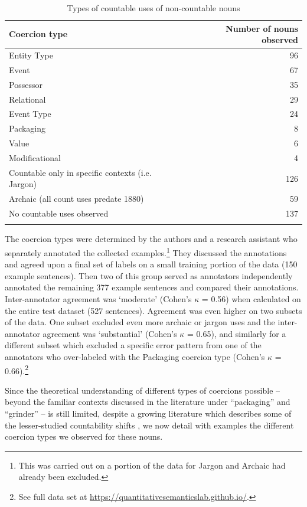 \documentclass[output=paper]{langscibook}
\begin{document}
\begin{table}
    \begin{tabular}{lr}
    \lsptoprule
        Coercion type    &  Number of nouns observed \\ 
  \midrule
 Entity Type  & 96 \\
 Event  & 67 \\ 
 Possessor  & 35 \\
 Relational & 29 \\
 Event Type  & 24 \\
 Packaging  & 8 \\
 Value & 6 \\
 Modificational & 4 \\
 Countable only in specific contexts (i.e. Jargon) & 126 \\
 Archaic (all count uses predate 1880) & 59 \\
  No countable uses observed & 137 \\
  \lspbottomrule
\end{tabular}
    \caption{Types of countable uses of non-countable nouns\label{gri-ric:tab:coercion}}
\end{table}


The coercion types were determined by the authors and a research assistant who separately annotated the collected examples.\footnote{This was carried out on a portion of the data for Jargon and Archaic had already been excluded.} They discussed the annotations and agreed upon a final set of labels on a small training portion of the data (150 example sentences). Then two of this group served as annotators independently annotated the remaining 377 example sentences and compared their annotations.  Inter-annotator agreement was `moderate' (Cohen's $\kappa$ = 0.56) when calculated on the entire test dataset (527 sentences). Agreement was even higher on two subsets of the data.   One subset excluded even more archaic or jargon uses and the inter-annotator agreement was `substantial' (Cohen's $\kappa$ = 0.65), and similarly for a different subset which excluded a specific error pattern from one of the annotators who over-labeled with the Packaging coercion type (Cohen's $\kappa$ = 0.66).\footnote{See full data set at \url{https://quantitativesemanticslab.github.io/}.}


Since the theoretical understanding of different types of coercions possible -- beyond the familiar contexts discussed in the literature under ``packaging'' and ``grinder''  -- is still limited, despite a growing literature which describes some of the lesser-studied countability shifts \citep{Huddleston2002,grimm2014individuating,Husic2020,ZamparelliToAppear},   we now detail with examples the different coercion types we observed for these nouns.
\end{document}
